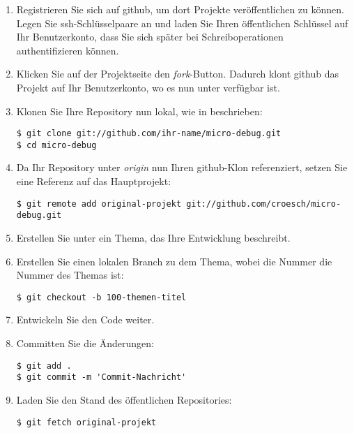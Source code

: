 \begin{enumerate}
\item Registrieren Sie sich auf github, um dort Projekte veröffentlichen zu können. Legen Sie ssh-Schlüsselpaare an und laden Sie Ihren öffentlichen Schlüssel auf Ihr Benutzerkonto, dass Sie sich später bei Schreiboperationen authentifizieren können.

\item Klicken Sie auf der Projektseite  den \emph{fork}-Button. Dadurch klont github das Projekt auf Ihr Benutzerkonto, wo es nun unter  verfügbar ist.

\item Klonen Sie Ihre Repository nun lokal, wie in  beschrieben:
\begin{verbatim}
$ git clone git://github.com/ihr-name/micro-debug.git
$ cd micro-debug
\end{verbatim}

\item Da Ihr Repository unter \emph{origin} nun Ihren github-Klon referenziert, setzen Sie eine Referenz auf das Hauptprojekt:
\begin{verbatim}
$ git remote add original-projekt git://github.com/croesch/micro-debug.git
\end{verbatim}

\item Erstellen Sie unter  ein Thema, das Ihre Entwicklung beschreibt.

\item Erstellen Sie einen lokalen Branch zu dem Thema, wobei die Nummer die Nummer des Themas ist:
\begin{verbatim}
$ git checkout -b 100-themen-titel
\end{verbatim}

\item Entwickeln Sie den Code weiter.

\item Committen Sie die Änderungen:
\begin{verbatim}
$ git add .
$ git commit -m 'Commit-Nachricht'
\end{verbatim}

\item Laden Sie den Stand des öffentlichen Repositories:
\begin{verbatim}
$ git fetch original-projekt
\end{verbatim}


\end{enumerate}
